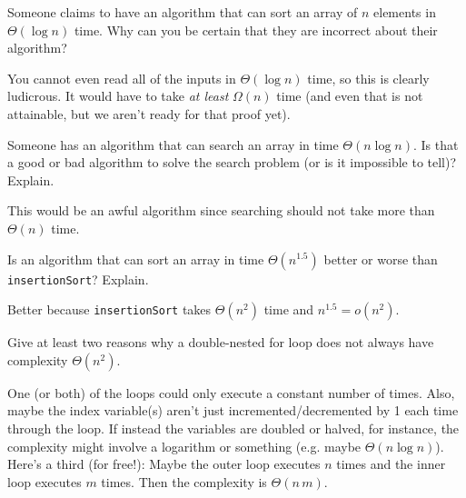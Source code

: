 \begin{requ}
Someone claims to have an algorithm that can sort an array of $n$ elements in $\Theta(\log n)$ time.
Why can you be certain that they are incorrect about their algorithm?
\begin{requanswer}
You cannot even read all of the inputs in $\Theta(\log n)$ time, so this is clearly ludicrous.
It would have to take {\em at least} $\Omega(n)$ time
(and even that is not attainable, but we aren't ready for that proof yet).
\end{requanswer}
\end{requ}

\begin{requ}
Someone has an algorithm that can search an array in time $\Theta(n\log n)$. 
Is that a good or bad algorithm to solve the search problem (or is it impossible to tell)? Explain.
\begin{requanswer}
This would be an awful algorithm since searching should not take more than $\Theta(n)$ time.
\end{requanswer}
\end{requ}

\begin{requ}
Is an algorithm that can sort an array in time $\Theta(n^{1.5})$ better or worse than \verb+insertionSort+? Explain.
\begin{requanswer}
Better because \verb+insertionSort+ takes $\Theta(n^2)$ time and $n^{1.5}=o(n^2)$.
\end{requanswer}
\end{requ}

\begin{requ}
Give at least two reasons why a double-nested for loop does not always have complexity $\Theta(n^2)$.
\begin{requanswer}
One (or both) of the loops could only execute a constant number of times. 
Also, maybe the index variable(s) aren't just incremented/decremented by 1 each time through the loop.
If instead the variables are doubled or halved, for instance, the complexity might involve a logarithm or something
(e.g. maybe $\Theta(n\log n)$).
Here's a third (for free!): Maybe the outer loop executes $n$ times and the inner loop executes $m$ times.
Then the complexity is $\Theta(n\, m)$.
\end{requanswer}
\end{requ}

